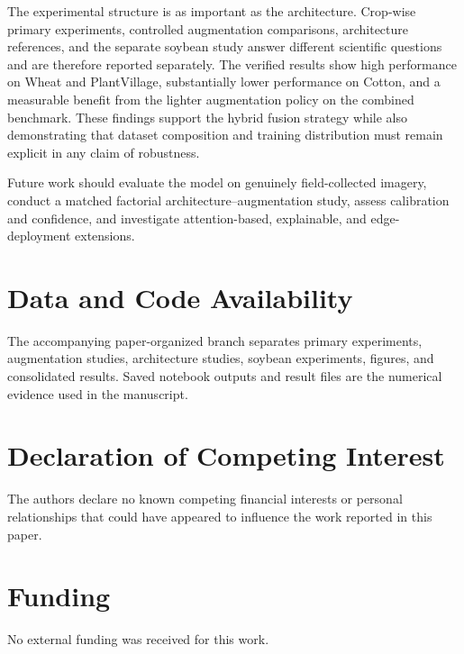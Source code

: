 \documentclass[a4paper,fleqn]{cas-dc}
\begin{document}
The experimental structure is as important as the architecture. Crop-wise primary experiments, controlled augmentation comparisons, architecture references, and the separate soybean study answer different scientific questions and are therefore reported separately. The verified results show high performance on Wheat and PlantVillage, substantially lower performance on Cotton, and a measurable benefit from the lighter augmentation policy on the combined benchmark. These findings support the hybrid fusion strategy while also demonstrating that dataset composition and training distribution must remain explicit in any claim of robustness.

Future work should evaluate the model on genuinely field-collected imagery, conduct a matched factorial architecture--augmentation study, assess calibration and confidence, and investigate attention-based, explainable, and edge-deployment extensions.

\section*{Data and Code Availability}
The accompanying paper-organized branch separates primary experiments, augmentation studies, architecture studies, soybean experiments, figures, and consolidated results. Saved notebook outputs and result files are the numerical evidence used in the manuscript.

\section*{Declaration of Competing Interest}
The authors declare no known competing financial interests or personal relationships that could have appeared to influence the work reported in this paper.

\section*{Funding}
No external funding was received for this work.
\end{document}
